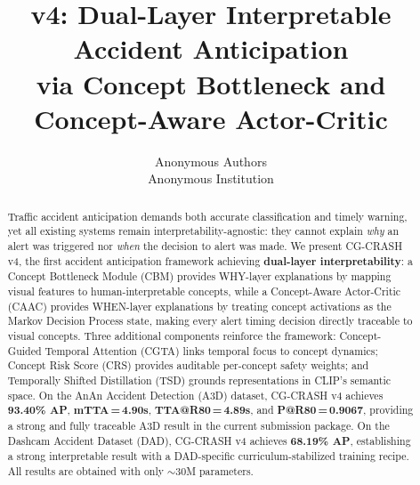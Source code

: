\documentclass{article}
\title{\method{} v4: Dual-Layer Interpretable Accident Anticipation \\
via Concept Bottleneck and Concept-Aware Actor-Critic}
\author{Anonymous Authors \\ Anonymous Institution}
\newcommand{\method}{CG-CRASH}
\newcommand{\caac}{\textsc{CAAC}}
\newcommand{\cgta}{\textsc{CGTA}}
\newcommand{\crs}{\textsc{CRS}}
\newcommand{\tsd}{\textsc{TSD}}
\newcommand{\cbm}{\textsc{CBM}}
\begin{document}
\maketitle

\begin{abstract}
Traffic accident anticipation demands both accurate classification and timely
warning, yet all existing systems remain interpretability-agnostic: they cannot
explain \emph{why} an alert was triggered nor \emph{when} the decision to alert
was made. We present \method{} v4, the first accident anticipation framework
achieving \textbf{dual-layer interpretability}: a Concept Bottleneck Module
(\cbm) provides WHY-layer explanations by mapping visual features to
human-interpretable concepts, while a Concept-Aware Actor-Critic (\caac)
provides WHEN-layer explanations by treating concept activations as the Markov
Decision Process state, making every alert timing decision directly traceable to
visual concepts. Three additional components reinforce the framework:
Concept-Guided Temporal Attention (\cgta) links temporal focus to concept
dynamics; Concept Risk Score (\crs) provides auditable per-concept safety
weights; and Temporally Shifted Distillation (\tsd) grounds representations in
CLIP's semantic space. On the AnAn Accident Detection (A3D) dataset,
\method{} v4 achieves \textbf{93.40\% AP}, \textbf{mTTA\,=\,4.90s},
\textbf{TTA@R80\,=\,4.89s}, and \textbf{P@R80\,=\,0.9067}, providing a
strong and fully traceable A3D result in the current submission package. On the Dashcam
Accident Dataset (DAD), \method{} v4 achieves \textbf{68.19\% AP}, establishing
a strong interpretable result with a DAD-specific curriculum-stabilized
training recipe.
All results are obtained with only $\sim$30M parameters.
\end{abstract}










\newpage

\end{document}
